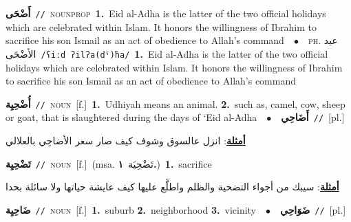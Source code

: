 \documentclass[10pt,a4paper,twoside]{article} %
\begin{document}
\begin{multicols}{2}
{\setlength\topsep{0pt}\textbf{\foreignlanguage{arabic}{أَضْحَى}}\ {\color{gray}\texttt{//}\color{black}}\ \textsc{noun\textunderscore prop}\ \textbf{1.}~Eid al-Adha is the latter of the two official holidays which are celebrated within Islam. It honors the willingness of Ibrahim to sacrifice his son Ismail as an act of obedience to Allah's command\ \ $\bullet$\ \ \textsc{ph.} \color{gray} \foreignlanguage{arabic}{عيد الأضْحَى}\color{black}\ {\color{gray}\texttt{/{\sffamily ʕiːd ʔilʔa(dˤ)ħa}/}\color{black}}\ \textbf{1.}~Eid al-Adha is the latter of the two official holidays which are celebrated within Islam. It honors the willingness of Ibrahim to sacrifice his son Ismail as an act of obedience to Allah's command\ } \vspace{2mm}

{\setlength\topsep{0pt}\textbf{\foreignlanguage{arabic}{أُضْحِيِة}}\ {\color{gray}\texttt{//}\color{black}}\ \textsc{noun}\ [f.]\ \textbf{1.}~Udhiyah means an animal.  \textbf{2.}~such as, camel, cow, sheep or goat, that is slaughtered during the days of ‘Eid al-Adha\ \ $\bullet$\ \ \setlength\topsep{0pt}\textbf{\foreignlanguage{arabic}{أَضَاحِي}}\ {\color{gray}\texttt{//}\color{black}}\ [pl.]\  \begin{flushright}\color{gray}\foreignlanguage{arabic}{\textbf{\underline{\foreignlanguage{arabic}{أمثلة}}}: انزل عالسوق وشوف كيف صار سعر الأضاحِي بالعلالي}\end{flushright}\color{black}} \vspace{2mm}

{\setlength\topsep{0pt}\textbf{\foreignlanguage{arabic}{تَضْحِيِة}}\ {\color{gray}\texttt{//}\color{black}}\ \textsc{noun}\ [f.]\ \color{gray}(msa. \foreignlanguage{arabic}{تَضْحِيَة}~\foreignlanguage{arabic}{\textbf{١.}})\color{black}\ \textbf{1.}~sacrifice\  \begin{flushright}\color{gray}\foreignlanguage{arabic}{\textbf{\underline{\foreignlanguage{arabic}{أمثلة}}}: سيبك من أجواء التضحية والظلم واطلَّع عليها كيف عايشة حياتها ولا سائلة بحدا}\end{flushright}\color{black}} \vspace{2mm}

{\setlength\topsep{0pt}\textbf{\foreignlanguage{arabic}{ضَاحِيِة}}\ {\color{gray}\texttt{//}\color{black}}\ \textsc{noun}\ [f.]\ \textbf{1.}~suburb  \textbf{2.}~neighborhood  \textbf{3.}~vicinity\ \ $\bullet$\ \ \setlength\topsep{0pt}\textbf{\foreignlanguage{arabic}{ضَوَاحِي}}\ {\color{gray}\texttt{//}\color{black}}\ [pl.]\ } \vspace{2mm}


\end{multicols}
\end{document}
